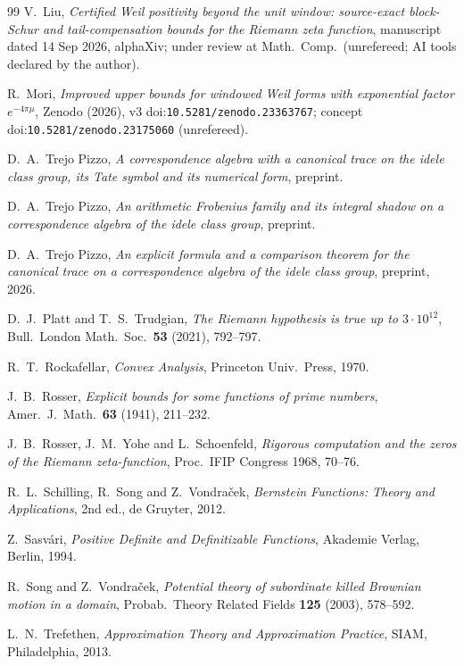 \documentclass[11pt]{amsart}
\theoremstyle{definition}
\theoremstyle{remark}
\begin{document}
\begin{thebibliography}{99}
 V.~Liu, \emph{Certified Weil positivity beyond the unit window: source-exact
block-Schur and tail-compensation bounds for the Riemann zeta function}, manuscript dated 14 Sep 2026,
alphaXiv; under review at Math.\ Comp.\ (unrefereed; AI tools declared by the author).

 R.~Mori, \emph{Improved upper bounds for windowed Weil forms with exponential factor
$e^{-4\pi\mu}$}, Zenodo (2026), v3 doi:\nolinkurl{10.5281/zenodo.23363767}; concept doi:\nolinkurl{10.5281/zenodo.23175060}
(unrefereed).

 D.~A.~Trejo Pizzo,
\emph{A correspondence algebra with a canonical trace on the idele class
group, its Tate symbol and its numerical form}, preprint.

 D.~A.~Trejo Pizzo,
\emph{An arithmetic Frobenius family and its integral shadow on a
correspondence algebra of the idele class group}, preprint.

 D.~A.~Trejo Pizzo, \emph{An explicit formula and a comparison theorem for the canonical trace on a correspondence
algebra of the idele class group}, preprint, 2026.

 D.~J.~Platt and T.~S.~Trudgian, \emph{The Riemann hypothesis is true up to
$3\cdot10^{12}$}, Bull.\ London Math.\ Soc.\ \textbf{53} (2021), 792--797.

 R.~T.~Rockafellar, \emph{Convex Analysis}, Princeton Univ.~Press, 1970.

 J.~B.~Rosser, \emph{Explicit bounds for some functions of prime numbers}, Amer.\ J.\
Math.\ \textbf{63} (1941), 211--232.

 J.~B.~Rosser, J.~M.~Yohe and L.~Schoenfeld, \emph{Rigorous computation and
the zeros of the Riemann zeta-function}, Proc.\ IFIP Congress 1968, 70--76.

 R.~L.~Schilling, R.~Song and Z.~Vondra\v{c}ek, \emph{Bernstein Functions:
Theory and Applications}, 2nd ed., de Gruyter, 2012.

 Z.~Sasv\'ari, \emph{Positive Definite and Definitizable Functions},
Akademie Verlag, Berlin, 1994.

 R.~Song and Z.~Vondra\v{c}ek, \emph{Potential theory of subordinate
killed Brownian motion in a domain}, Probab.~Theory Related Fields \textbf{125} (2003), 578--592.

 L.~N.~Trefethen, \emph{Approximation Theory and Approximation Practice},
SIAM, Philadelphia, 2013.


\end{thebibliography}
\end{document}
